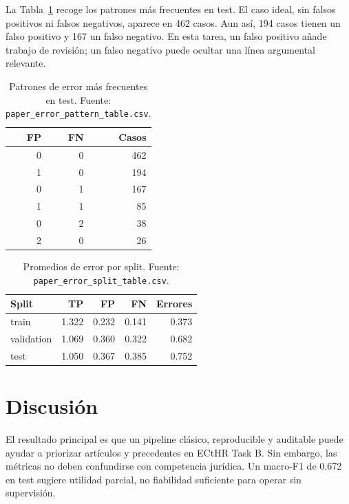\documentclass[11pt,a4paper]{article}
\begin{document}
La Tabla~\ref{tab:error_patterns} recoge los patrones más frecuentes en test. El caso ideal, sin falsos positivos ni falsos negativos, aparece en 462 casos. Aun así, 194 casos tienen un falso positivo y 167 un falso negativo. En esta tarea, un falso positivo añade trabajo de revisión; un falso negativo puede ocultar una línea argumental relevante.

\begin{table}[H]
\centering
\caption{Patrones de error más frecuentes en test. Fuente: \texttt{paper\_error\_pattern\_table.csv}.}
\label{tab:error_patterns}
\small
\begin{tabular}{@{}rrr@{}}
\toprule
\textbf{FP} & \textbf{FN} & \textbf{Casos}\\
\midrule
0 & 0 & 462\\
1 & 0 & 194\\
0 & 1 & 167\\
1 & 1 & 85\\
0 & 2 & 38\\
2 & 0 & 26\\
\bottomrule
\end{tabular}
\end{table}

\begin{table}[H]
\centering
\caption{Promedios de error por split. Fuente: \texttt{paper\_error\_split\_table.csv}.}
\label{tab:error_split}
\small
\begin{tabular}{@{}lrrrr@{}}
\toprule
\textbf{Split} & \textbf{TP} & \textbf{FP} & \textbf{FN} & \textbf{Errores}\\
\midrule
train & 1.322 & 0.232 & 0.141 & 0.373\\
validation & 1.069 & 0.360 & 0.322 & 0.682\\
test & 1.050 & 0.367 & 0.385 & 0.752\\
\bottomrule
\end{tabular}
\end{table}

\section{Discusión}
\label{sec:discusion}

El resultado principal es que un pipeline clásico, reproducible y auditable puede ayudar a priorizar artículos y precedentes en ECtHR Task B. Sin embargo, las métricas no deben confundirse con competencia jurídica. Un macro-F1 de 0.672 en test sugiere utilidad parcial, no fiabilidad suficiente para operar sin supervisión.
\end{document}
